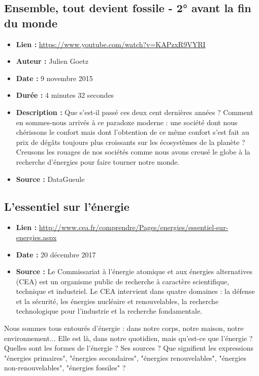\documentclass[8pt]{article}
\begin{document}
\subsection{Ensemble, tout devient fossile - 2° avant la fin du monde}
\begin{itemize}
	\item \textbf{Lien : }  \url{https://www.youtube.com/watch?v=KAPzxR9VYRI} 
	\item \textbf{Auteur : } Julien Goetz
	\item \textbf{Date : } 9 novembre 2015
	\item \textbf{Durée : } 4 minutes 32 secondes
	\item \textbf{Description : } Que s’est-il passé ces deux cent dernières années ? Comment en sommes-nous arrivés à ce paradoxe moderne : une société dont nous chérissons le confort mais dont l’obtention de ce même confort s’est fait au prix de dégâts toujours plus croissants sur les écosystèmes de la planète ? Creusons les rouages de nos sociétés comme nous avons creusé le globe à la recherche d’énergies pour faire tourner notre monde.
	\item \textbf{Source : } DataGueule
\end{itemize}

\subsection{L'essentiel sur l'énergie}
\begin{itemize}
	\item \textbf{Lien : }  \url{http://www.cea.fr/comprendre/Pages/energies/essentiel-sur-energies.aspx}  
	\item \textbf{Date : }   20 décembre 2017 
	\item \textbf{Source : }  Le Commissariat à l’énergie atomique et aux énergies alternatives (CEA) est un organisme public de recherche à caractère scientifique, technique et industriel. Le CEA intervient dans quatre domaines : la défense et la sécurité, les énergies nucléaire et renouvelables, la recherche technologique pour l'industrie et la recherche fondamentale.
\end{itemize}

Nous sommes tous entourés d'énergie : dans notre corps, notre maison, notre environnement... Elle est là, dans notre quotidien, mais qu'est-ce que l'énergie ? Quelles sont les formes de l'énergie ? Ses sources ? Que signifient les expressions "énergies primaires", "énergies secondaires", "énergies renouvelables", "énergies non-renouvelables", "énergies fossiles" ? \\
\end{document}
